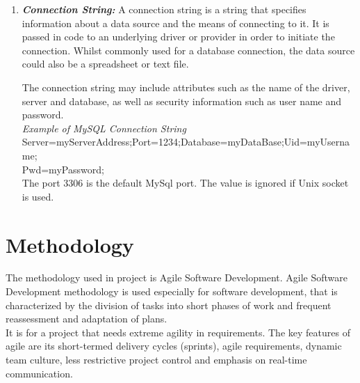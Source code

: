 \begin{enumerate}
\item \textbf{\emph{Connection String:}} A connection string is a string that specifies information about a data source and the means of connecting to it. It is passed in code to an underlying driver or provider in order to initiate the connection. Whilst commonly used for a database connection, the data source could also be a spreadsheet or text file.

The connection string may include attributes such as the name of the driver, server and database, as well as security information such as user name and password.\\

\emph{Example of MySQL Connection String}\\
Server=myServerAddress;Port=1234;Database=myDataBase;Uid=myUsername;\\
Pwd=myPassword;\\

The port 3306 is the default MySql port. The value is ignored if Unix socket is used.
\end{enumerate}


\pagebreak
\section{Methodology}
The methodology used in project is Agile Software Development. Agile Software Development methodology is used especially for software development, that is characterized by the division of tasks into short phases of work and frequent reassessment and adaptation of plans.\\

It is for a project that needs extreme agility in requirements. The key features of agile are its short-termed delivery cycles (sprints), agile requirements, dynamic team culture, less restrictive project control and emphasis on real-time communication.\\

